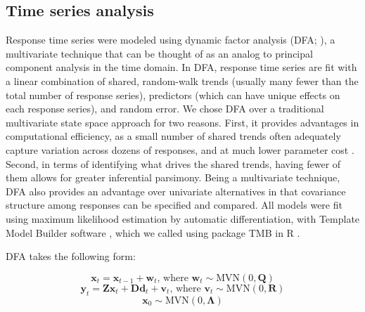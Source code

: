 \documentclass[notitlepage]{article}
\begin{document}

\subsection*{Time series analysis}
Response time series were modeled using dynamic factor analysis (DFA; \citealt{zuur2003estimating}), a multivariate technique that can be thought of as an analog to principal component analysis in the time domain. In DFA, response time series are fit with a linear combination of shared, random-walk trends (usually many fewer than the total number of response series), predictors (which can have unique effects on each response series), and random error. We chose DFA over a traditional multivariate state space approach for two reasons. First, it provides advantages in computational efficiency, as a small number of shared trends often adequately capture variation across dozens of responses, and at much lower parameter cost \citep{zuur2003dynamic}. Second, in terms of identifying what drives the shared trends, having fewer of them allows for greater inferential parsimony. Being a multivariate technique, DFA also provides an advantage over univariate alternatives in that covariance structure among responses can be specified and compared. All models were fit using maximum likelihood estimation by automatic differentiation, with Template Model Builder software \citep{kristensen2015tmb}, which we called using package TMB in R \citep{Rmanual,tmbPackage}.

DFA takes the following form:

\begin{equation}
    \textbf{x}_t = \textbf{x}_{t-1} + \textbf{w}_t\textrm{, where } \textbf{w}_t \sim \textrm{MVN}(0,\textbf{Q})
\end{equation}
\begin{equation}
    \textbf{y}_t = \textbf{Zx}_t + \textbf{Dd}_t + \textbf{v}_t\textrm{, where } \textbf{v}_t \sim \textrm{MVN}(0,\textbf{R})
\end{equation}
\begin{equation}
    \textbf{x}_0 \sim \textrm{MVN}(0,\bm{\Lambda})
\end{equation}
\end{document}

